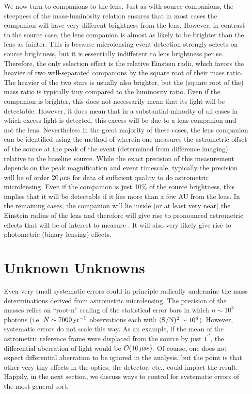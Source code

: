 \documentclass[12pt,preprint]{aastex}
\def\muas{{\mu\rm as}}
\begin{document}
We now turn to companions to the lens.  Just as with source companions,
the steepness of the mass-luminosity relation ensures that in most
cases the companion will have very different brightness from the lens.
However, in contrast to the source case, the lens companion is almost
as likely to be brighter than the lens as fainter.  This is because
microlensing event detection strongly selects on source brightness, but
it is essentially indifferent to lens brightness per se.  Therefore, the
only selection effect is the relative Einstein radii, which favors
the heavier of two well-separated companions by the square root of their
mass ratio.  The heavier of the two stars is usually also brighter, but
the (square root of the) mass ratio is typically tiny compared to the
luminosity ratio.
Even if the companion is brighter, this does not necessarily mean that
its light will be detectable.  However, it does mean that
in a substantial minority of all cases in which excess light is
detected, this excess will be due to a lens companion and not the
lens.  Nevertheless in the great majority of these cases, the lens
companion can be identified using the method of \citet{mb11293B}
wherein one measures the astrometric offset of the source at the
peak of the event (determined from difference imaging) relative to
the baseline source.  While the exact precision of this measurement
depends on the peak magnification and event timescale, typically
the precision will be of order $20\,\muas$ for data of sufficient
quality to do astrometric microlensing.  Even if the companion is
just 10\% of the source brightness, this implies that it will be
detectable if it lies more than a few AU from the lens.  In the remaining
cases, the companion will lie inside (or at least very near) the Einstein
radius of the lens and therefore will give rise to pronounced astrometric
effects that will be of interest to measure \citep{han99b,han01,gouldhan}.
It will also very likely give rise to photometric (binary lensing)
effects.

\section{{Unknown Unknowns}
\label{sec:unknown2}}

Even very small systematic errors could in principle radically undermine 
the mass determinations derived from astrometric microlensing.
The precision of the masses relies on ``root-n'' scaling
of the statistical error bars in which $n\sim 10^8$ photons
(i.e. $N\sim 7000\,{\rm yr}^{-1}$ observations
each with ${\rm (S/N)^2}\sim 10^4$). However, systematic errors do
not scale this way.
As an example, if the mean of the astrometric reference frame were 
displaced from the source by just $1^{\prime\prime}$, the differential
aberration of light would be ${\cal O}(10\,\muas)$.  Of course, one
does not expect differential aberration to be ignored in the analysis,
but the point is that other very tiny effects in the optics, the 
detector, etc., could impact the result.  Happily, in the next section, 
we discuss ways to control for systematic errors of the most general sort.
\end{document}
